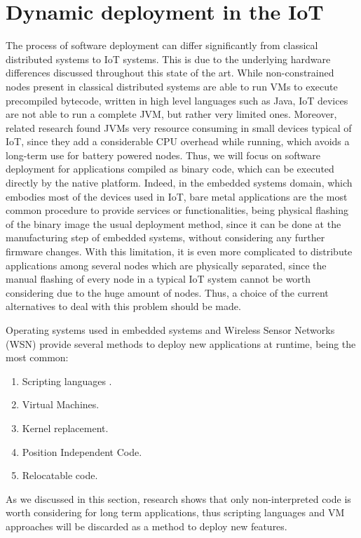 \section{Dynamic deployment in the IoT}
\label{sec:IoTDeployment}
The process of software deployment can differ significantly from classical distributed systems to IoT systems.
This is due to the underlying hardware differences discussed throughout this state of the art.
While non-constrained nodes present in classical distributed systems are able to run VMs to execute precompiled bytecode, written in high level languages such as Java, IoT devices are not able to run a complete JVM, but rather very limited ones\cite{levis2002mate}\cite{brouwers2009darjeeling}.
Moreover, related research\cite{oliver2014reprogramming} found JVMs very resource consuming in small devices typical of IoT, since they add a considerable CPU overhead while running, which avoids a long-term use for battery powered nodes.
Thus, we will focus on software deployment for applications compiled as binary code, which can be executed directly by the native platform.
Indeed, in the embedded systems domain, which embodies most of the devices used in IoT, bare metal applications are the most common procedure to provide services or functionalities, being physical flashing of the binary image the usual deployment method, since it can be done at the manufacturing step of embedded systems, without considering any further firmware changes.
With this limitation, it is even more complicated to distribute applications among several nodes which are physically separated, since the manual flashing of every node in a typical IoT system cannot be worth considering due to the huge amount of nodes.
Thus, a choice of the current alternatives to deal with this problem should be made.

Operating systems used in embedded systems and Wireless Sensor Networks (WSN) provide several methods to deploy new applications at runtime, being the most common:
\begin{enumerate}
	\item Scripting languages \cite{dunkels2006low}\cite{kovatsch2012actinium}.
	\item Virtual Machines.
	\item Kernel replacement.
	\item Position Independent Code.
	\item Relocatable code.
\end{enumerate}
As we discussed in this section, research shows that only non-interpreted code is worth considering for long term applications, thus scripting languages and VM approaches will be discarded as a method to deploy new features.

